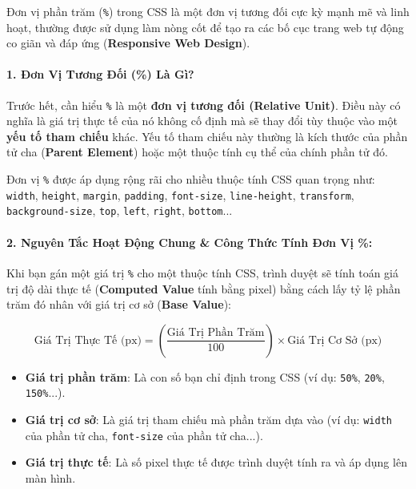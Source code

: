 \documentclass[11pt,oneside]{book}
\newcommand{\codeinline}[1]{\textcolor{accentOrange}{\texttt{#1}}}
\newcommand{\term}[1]{\textbf{\textcolor{primaryBlue}{#1}}}
\begin{document}
Đơn vị phần trăm (\codeinline{\%}) trong CSS là một đơn vị tương đối cực kỳ mạnh mẽ và linh hoạt, thường được sử dụng làm nòng cốt để tạo ra các bố cục trang web tự động co giãn và đáp ứng (\term{Responsive Web Design}).

\paragraph{1. Đơn Vị Tương Đối (\%) Là Gì?}

\begin{conceptBox}
Trước hết, cần hiểu \codeinline{\%} là một \textbf{đơn vị tương đối (\term{Relative Unit})}. Điều này có nghĩa là giá trị thực tế của nó không cố định mà sẽ thay đổi tùy thuộc vào một \textbf{yếu tố tham chiếu} khác. Yếu tố tham chiếu này thường là kích thước của phần tử cha (\term{Parent Element}) hoặc một thuộc tính cụ thể của chính phần tử đó.
\par\vspace{4pt}
Đơn vị \codeinline{\%} được áp dụng rộng rãi cho nhiều thuộc tính CSS quan trọng như: \codeinline{width}, \codeinline{height}, \codeinline{margin}, \codeinline{padding}, \codeinline{font-size}, \codeinline{line-height}, \codeinline{transform}, \codeinline{background-size}, \codeinline{top}, \codeinline{left}, \codeinline{right}, \codeinline{bottom}...
\end{conceptBox}

\paragraph{2. Nguyên Tắc Hoạt Động Chung \& Công Thức Tính Đơn Vị \%:}

Khi bạn gán một giá trị \codeinline{\%} cho một thuộc tính CSS, trình duyệt sẽ tính toán giá trị độ dài thực tế (\term{Computed Value} tính bằng pixel) bằng cách lấy tỷ lệ phần trăm đó nhân với giá trị cơ sở (\term{Base Value}):

\begin{conceptBox}
\[
\text{Giá Trị Thực Tế (px)} = \left( \frac{\text{Giá Trị Phần Trăm}}{100} \right) \times \text{Giá Trị Cơ Sở (px)}
\]
\begin{itemize}[leftmargin=1.5em, itemsep=2pt, parsep=0pt]
    \item \textbf{Giá trị phần trăm}: Là con số bạn chỉ định trong CSS (ví dụ: \codeinline{50\%}, \codeinline{20\%}, \codeinline{150\%}...).
    \item \textbf{Giá trị cơ sở}: Là giá trị tham chiếu mà phần trăm dựa vào (ví dụ: \codeinline{width} của phần tử cha, \codeinline{font-size} của phần tử cha...).
    \item \textbf{Giá trị thực tế}: Là số pixel thực tế được trình duyệt tính ra và áp dụng lên màn hình.
\end{itemize}
\end{conceptBox}
\end{document}
